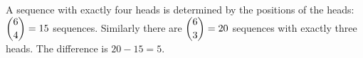 A sequence with exactly four heads is determined by the positions of the heads: $\dbinom64=15$ sequences. Similarly there are $\dbinom63=20$ sequences with exactly three heads. The difference is $20-15=\boxed{5}$.
